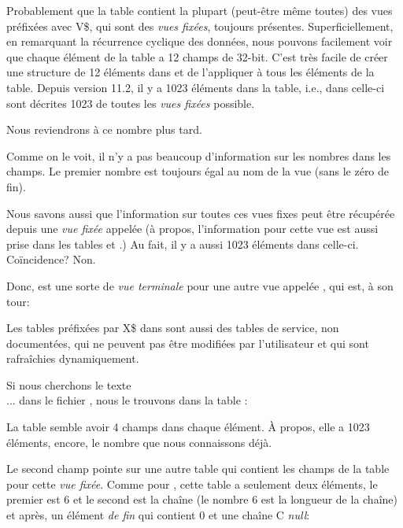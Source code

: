Probablement que la table  contient la plupart (peut-être même toutes)
des vues préfixées avec V\$, qui sont des \emph{vues fixées}, toujours présentes.
Superficiellement, en remarquant la récurrence cyclique des données, nous pouvons
facilement voir que chaque élément de la table  a 12 champs de 32-bit.
C'est très facile de créer une structure de 12 éléments dans \IDA et de l'appliquer
à tous les éléments de la table.
Depuis \oracle version 11.2, il y a 1023 éléments dans la table, i.e., dans celle-ci
sont décrites 1023 de toutes les \emph{vues fixées} possible.

Nous reviendrons à ce nombre plus tard.

Comme on le voit, il n'y a pas beaucoup d'information sur les nombres dans les champs.
Le premier nombre est toujours égal au nom de la vue (sans le zéro de fin).

Nous savons aussi que l'information sur toutes ces vues fixes peut être récupérée
depuis une \emph{vue fixée} appelée  (à propos, l'information
pour cette vue est aussi prise dans les tables  et .)
Au fait, il y a aussi 1023 éléments dans celle-ci. Coïncidence? Non.



Donc,  est une sorte de \emph{vue terminale} pour une autre vue appelée
, qui est, à son tour:



Les tables préfixées par X\$ dans \oracle sont aussi des tables de service, non documentées,
qui ne peuvent pas être modifiées par l'utilisateur et qui sont rafraîchies dynamiquement.

Si nous cherchons le texte \\

...  dans le fichier , nous le trouvons dans la table :



La table semble avoir 4 champs dans chaque élément. À propos, elle a 1023 éléments,
encore, le nombre que nous connaissons déjà.

Le second champ pointe sur une autre table qui contient les champs de la table pour
cette \emph{vue fixée}.
Comme pour , cette table a seulement deux éléments, le premier est
6 et le second est la chaîne  (le nombre 6 est la longueur de la chaîne)
et après, un élément \emph{de fin} qui contient 0 et une chaîne C \emph{null}:

